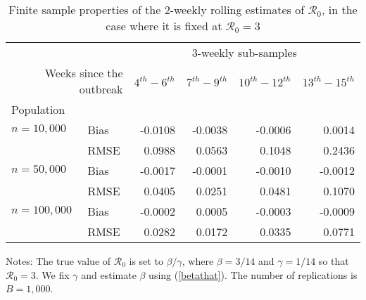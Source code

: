 \documentclass[12pt]{article}
\begin{document}
\begin{table}[t]%
\caption
{Finite sample properties of the 2-weekly rolling estimates of $\mathcal
{R}_0$, in the case where it is fixed at ${\mathcal{R}_0}=3$}%
\label{tab: R0_2W}%
\renewcommand{\arraystretch}{1.1}%
\vspace{-0.35cm}%


\begin{center}%
\begin{tabular}
[c]{llcccc}\hline
&  & \multicolumn{4}{c}{3-weekly sub-samples}\\\cline{3-6}%
\multicolumn{2}{r}{Weeks since the outbreak} & $4^{th}-6^{th}$ &
$7^{th}-9^{th}$ & $10^{th}-12^{th}$ & $13^{th}-15^{th}$\\\hline
Population &  &  &  &  & \\
$n=10,000$ & Bias & \multicolumn{1}{r}{-0.0108} & \multicolumn{1}{r}{-0.0038}
& \multicolumn{1}{r}{-0.0006} & \multicolumn{1}{r}{0.0014}\\
& RMSE & \multicolumn{1}{r}{0.0988} & \multicolumn{1}{r}{0.0563} &
\multicolumn{1}{r}{0.1048} & \multicolumn{1}{r}{0.2436}\\
$n=50,000$ & Bias & \multicolumn{1}{r}{-0.0017} & \multicolumn{1}{r}{-0.0001}
& \multicolumn{1}{r}{-0.0010} & \multicolumn{1}{r}{-0.0012}\\
& RMSE & \multicolumn{1}{r}{0.0405} & \multicolumn{1}{r}{0.0251} &
\multicolumn{1}{r}{0.0481} & \multicolumn{1}{r}{0.1070}\\
$n=100,000$ & Bias & \multicolumn{1}{r}{-0.0002} & \multicolumn{1}{r}{0.0005}
& \multicolumn{1}{r}{-0.0003} & \multicolumn{1}{r}{-0.0009}\\
& RMSE & \multicolumn{1}{r}{0.0282} & \multicolumn{1}{r}{0.0172} &
\multicolumn{1}{r}{0.0335} & \multicolumn{1}{r}{0.0771}\\\hline
\end{tabular}



\end{center}

%

\footnotesize\flushleft
{}Notes: The true value of $\mathcal{R}_{0}$ is set to $\beta/\gamma$, where
$\beta=3/14$ and $\gamma=1/14$ so that $\mathcal{R}_{0}=3$. We fix $\gamma$
and estimate $\beta$ using (\ref{betathat}). The number of replications is
$B=1,000$.%

\end{table}%
\end{document}
